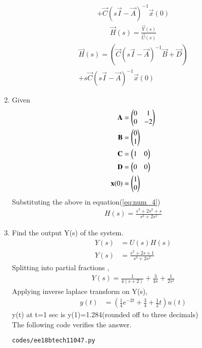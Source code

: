 \begin{enumerate}[label=\thesubsection.\arabic*.,ref=\thesubsection.\theenumi]
\begin{multline}
\\
+ \vec{C}(s\vec{I}-\vec{A})^{-1}\vec{x}(0) 
\end{multline}
\begin{align}
\vec{H}(s) = \frac{\vec{Y}(s)}{\vec{U}(s)}
\end{align}
\begin{multline}
\vec{H}(s)=( \vec{C}{(s\vec{I}-\vec{A})^{-1}}\vec{B}+\vec{D}) 
\\
+ s\vec{C}(s\vec{I}-\vec{A})^{-1}\vec{x}(0) \label{eq:num_4}
\end{multline}
\item Given
\begin{align}
\mathbf{A}&=\begin{pmatrix}0&1\\0&-2\end{pmatrix}\\
\mathbf{B}&=\begin{pmatrix}0\\1\end{pmatrix}\\
\mathbf{C}&=\begin{pmatrix}1&0\end{pmatrix}\\
\mathbf{D}&=\begin{pmatrix}0&0\end{pmatrix}\\
\mathbf{x}(0)&=\begin{pmatrix}1\\0\end{pmatrix}
\end{align}
Substituting the above in equation(\ref{eq:num_4})
\begin{align}
{H}(s) = \frac{s^{3}+2s^{2}+s}{s^{3}+2s^{2}}
\end{align}
\item Find the output Y(s) of the system.
\\
\solution
\begin{align}
{Y}(s) &= {U}(s){H}(s)
\\
{Y}(s)&=\frac{s^{2}+2s+1}{s^{3}+2s^{2}}
\end{align}
Splitting into partial fractions ,
\begin{align}
{Y}(s)=\frac{1}{4(s+2)}+\frac{3}{4s}+\frac{1}{2s^{2}}
\end{align}
Applying inverse laplace transform on Y(s),
\begin{align}
y(t)&=(\frac{1}{4}e^{-2t}+\frac{3}{4}+\frac{1}{2}t)u(t)
\end{align}
y(t) at t=1 sec is
y(1)=1.284(rounded off to three decimals)\\
The following code verifies the answer.
\begin{lstlisting}
codes/ee18btech11047.py
\end{lstlisting}
\end{enumerate}
